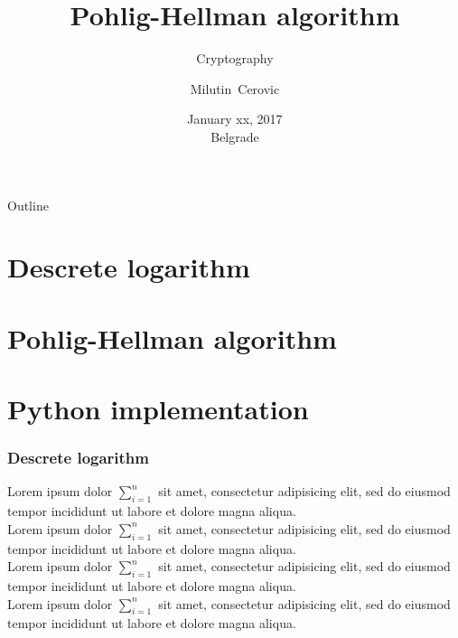 \documentclass{beamer}
\title{Pohlig-Hellman algorithm}
\subtitle{Cryptography}
\author{Milutin~Cerovic}
\institute{Faculty of Computer Science,\\Union University}
\date{January xx, 2017\\Belgrade}
\begin{document}
\begin{frame}
  \titlepage
\end{frame}

\begin{frame}{Outline}
  \tableofcontents
\end{frame}

\section{Descrete logarithm}
\section{Pohlig-Hellman algorithm}
\section{Python implementation}

\begin{frame}
\frametitle{Descrete logarithm}
Lorem ipsum dolor $\sum_{i=1}^{n}$  sit amet, consectetur adipisicing elit, sed do eiusmod tempor incididunt ut labore et dolore magna aliqua.\\Lorem ipsum dolor $\sum_{i=1}^{n}$  sit amet, consectetur adipisicing elit, sed do eiusmod tempor incididunt ut labore et dolore magna aliqua.\\Lorem ipsum dolor $\sum_{i=1}^{n}$  sit amet, consectetur adipisicing elit, sed do eiusmod tempor incididunt ut labore et dolore magna aliqua.\\Lorem ipsum dolor $\sum_{i=1}^{n}$  sit amet, consectetur adipisicing elit, sed do eiusmod tempor incididunt ut labore et dolore magna aliqua.
\end{frame}
\end{document}
